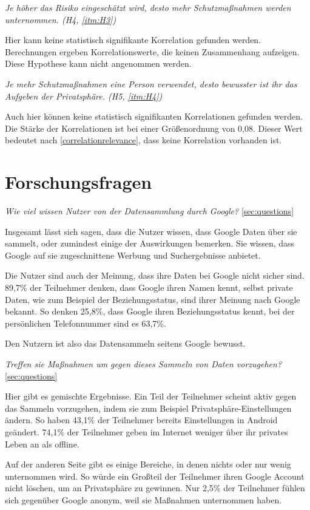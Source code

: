\textit{Je höher das Risiko eingeschätzt wird, desto mehr Schutzmaßnahmen werden unternommen. (H4, \ref{itm:H3})}

Hier kann keine statistisch signifikante Korrelation gefunden werden. Berechnungen ergeben Korrelationswerte, die keinen Zusammenhang aufzeigen. Diese Hypothese kann nicht angenommen werden.

\textit{Je mehr Schutzmaßnahmen eine Person verwendet, desto bewusster ist ihr das Aufgeben der Privatsphäre. (H5, \ref{itm:H4})}

Auch hier können keine statistisch signifikanten Korrelationen gefunden werden. Die Stärke der Korrelationen ist bei einer Größenordnung von 0,08. Dieser Wert bedeutet nach \ref{correlationrelevance}, dass keine Korrelation vorhanden ist.

\section{Forschungsfragen}
\label{sec:forschungsfragen}
\textit{Wie viel wissen Nutzer von der Datensammlung durch Google?} \ref{sec:questions}

Insgesamt lässt sich sagen, dass die Nutzer wissen, dass Google Daten über sie sammelt, oder zumindest einige der Auswirkungen bemerken. Sie wissen, dass Google auf sie zugeschnittene Werbung und Suchergebnisse anbietet.

Die Nutzer sind auch der Meinung, dass ihre Daten bei Google nicht sicher sind. 89,7\% der Teilnehmer denken, dass Google ihren Namen kennt, selbst private Daten, wie zum Beispiel der Beziehungsstatus, sind ihrer Meinung nach Google bekannt. So denken 25,8\%, dass Google ihren Beziehungsstatus kennt, bei der persönlichen Telefonnummer sind es 63,7\%.

Den Nutzern ist also das Datensammeln seitens Google bewusst.

\textit{Treffen sie Maßnahmen um gegen dieses Sammeln von Daten vorzugehen?} \ref{sec:questions}

Hier gibt es gemischte Ergebnisse. Ein Teil der Teilnehmer scheint aktiv gegen das Sammeln vorzugehen, indem sie zum Beispiel Privatsphäre-Einstellungen ändern. So haben 43,1\% der Teilnehmer bereits Einstellungen in Android geändert. 74,1\% der Teilnehmer geben im Internet weniger über ihr privates Leben an als offline.

Auf der anderen Seite gibt es einige Bereiche, in denen nichts oder nur wenig unternommen wird. So würde ein Großteil der Teilnehmer ihren Google Account nicht löschen, um an Privatsphäre zu gewinnen. Nur 2,5\% der Teilnehmer fühlen sich gegenüber Google anonym, weil sie Maßnahmen unternommen haben.

